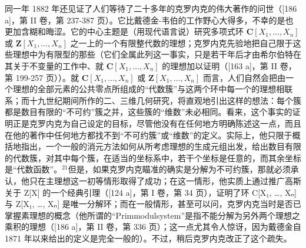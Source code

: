 同一年 1882 年还见证了人们等待了二十多年的克罗内克的伟大著作的问世（{[}186 a{]}，第 II 卷，第 237-387 页）。它比戴德金-韦伯的工作野心大得多，不幸的是也更加含糊和晦涩。它的中心主题是（用现代语言说）研究多项式环 \(\mathbf{C}[X_1,\ldots ,X_n]\) 或 \(\mathbf{Z}[X_1,\ldots ,X_n]\) 之一上的一个有限整代数的理想；克罗内克先验地把自己限于这些理想中为有限型的那些（它们全属此列这一事实，只是若干年后才由希尔伯特在其关于不变量的工作中、就 \(\mathbf{C}[X_1,\ldots ,X_n]\) 的理想加以证明（{[}163 a{]}，第 II 卷，第 199-257 页））。就 \(\mathbf{C}[X_1,\ldots ,X_n]\) 或 \(\mathbf{Z}[X_1,\ldots ,X_n]\) 而言，人们自然会把由一个理想的全部元素的公共零点所组成的“代数簇”与这两个环中每一个的理想相联系；而十九世纪期间所作的二、三维几何研究，将直观地引出这样的想法：每个簇都是数目有限的“不可约”簇之并，这些簇的“维数”未必相同。看来，这个事实的证明正是克罗内克为自己设定的目标，尽管他没有在任何地方明确陈述这一点，而且在他的著作中任何地方都找不到“不可约簇”或“维数”的定义。实际上，他只限于概括地指出，一个一般的消元方法如何从所考虑理想的生成元组出发，给出数目有限的代数簇，对其中每个簇，在适当的坐标系中，若干个坐标是任意的，而其余坐标是“代数函数”。\(^{21}\)但是，如果克罗内克瞄准的确实是分解为不可约簇，那就必须承认，他只在主理想这一初等情形取得了成功；在这一情形，他实质上通过推广高斯关于 Z{[}X{]} 的一个经典引理（{[}124 a{]}，第 I 卷，第 34 页），证明了环 C{[}X₁, \ldots, Xₙ{]} 与 Z{[}X₁, \ldots, Xₙ{]} 是唯一分解环；而在一般情形，甚至可以问，克罗内克当时是否已掌握素理想的概念（他所谓的“Primmodulsystem”是指不能分解为另外两个理想之乘积的理想（{[}186 a{]}，第 II 卷，第 336 页）；这一点尤其令人惊讶，因为戴德金自 1871 年以来给出的定义是完全一般的）。不过，稍后克罗内克改正了这个疏失。

